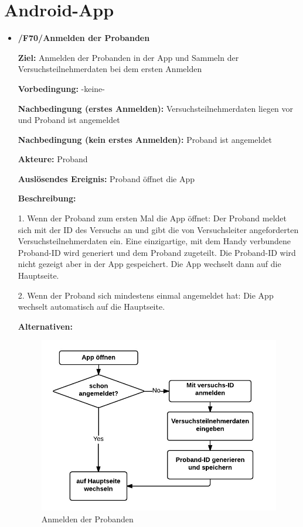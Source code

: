 \documentclass[a4paper]{scrreprt}
\begin{document}
    \newpage
    \section{\gls{Android-App}}

        \begin{itemize}
            \item \textbf{/F70/Anmelden der \gls{Proband}en}

                \par \textbf{Ziel: }Anmelden der \gls{Proband}en in der App und Sammeln der Versuchsteilnehmerdaten bei dem ersten Anmelden
                \par \textbf{Vorbedingung: }-keine-
                \par \textbf{Nachbedingung (erstes Anmelden): }Versuchsteilnehmerdaten liegen vor und \gls{Proband} ist angemeldet
                \par \textbf{Nachbedingung (kein erstes Anmelden): }\gls{Proband} ist angemeldet
                \par \textbf{Akteure: }\gls{Proband}
                \par \textbf{Auslösendes Ereignis: }\gls{Proband} öffnet die App
                \par \textbf{Beschreibung: }
                \par 1. Wenn der \gls{Proband} zum ersten Mal die App öffnet: Der \gls{Proband} meldet sich mit der ID des Versuchs an und gibt die
                 von \gls{Versuchsleiter} angeforderten Versuchsteilnehmerdaten ein. Eine einzigartige, mit dem Handy verbundene \gls{Proband}-ID wird generiert und dem \gls{Proband} zugeteilt. Die \gls{Proband}-ID wird nicht gezeigt aber in der App gespeichert. Die App wechselt dann auf die Hauptseite.
                \par 2. Wenn der \gls{Proband} sich mindestens einmal angemeldet hat: Die App wechselt automatisch auf die Hauptseite.
                \par \textbf{Alternativen: }
                \begin{figure}[ht]
                    \centering
                    \includegraphics[scale=1]{AppAnmelden.jpeg}
                    \caption{Anmelden der \gls{Proband}en}
                \end{figure}



\end{itemize}
\end{document}
